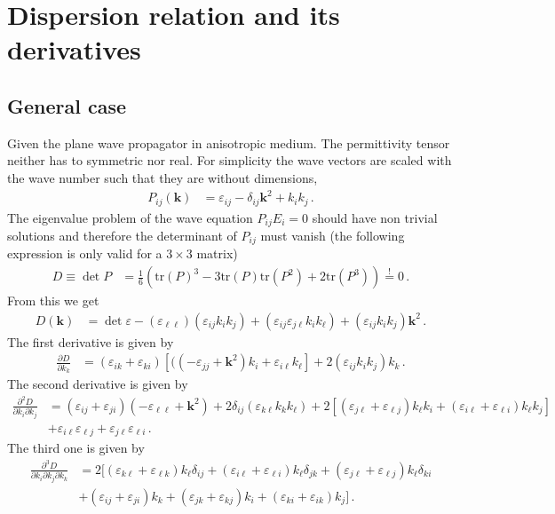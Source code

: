 \documentclass[12pt,a4paper,twoside,openright,BCOR10mm,headsepline,titlepage,abstracton,chapterprefix,final]{scrreprt}
\newcommand{\vct}[1]{\mathbf{#1}}
\newcommand{\eps}[1]{\varepsilon_{#1}}
\newcommand{\deteps}{\det \varepsilon}
\newcommand{\tr}[1]{\text{tr}\left(#1\right)}
\begin{document}
\section{Dispersion relation and its derivatives}

\subsection{General case}

Given the plane wave propagator in anisotropic medium. The permittivity tensor neither has to symmetric nor real.
For simplicity the wave vectors are scaled with the wave number such that they are without dimensions,
\begin{align}
 P_{ij}(\vct{k}) &= \eps{ij} - \delta_{ij} \vct{k}^2 + k_i k_j\,.
\end{align}
The eigenvalue problem of the wave equation $P_{ij} E_i = 0$ should have non trivial solutions and therefore the determinant of $P_{ij}$
must vanish (the following expression is only valid for a $3\times3$ matrix)
\begin{align}
 D \equiv \det P &= \frac{1}{6} (\tr{P}^3 - 3 \tr{P} \tr{P^2} + 2 \tr{P^3}) \stackrel{!}{=} 0\,.
\end{align}
From this we get
\begin{align}
 D(\vct{k}) &= \deteps - (\eps{\ell\ell}) (\eps{ij} k_i k_j) + (\eps{ij} \eps{j \ell} k_i k_\ell) + (\eps{ij} k_i k_j) \vct{k}^2\,. 
\end{align}
The first derivative is given by
\begin{align}
 \frac{\partial D}{\partial k_k} &= (\eps{ik} + \eps{ki}) [((-\eps{jj} + \vct{k}^2)k_i + \eps{i\ell} k_\ell] + 2(\eps{ij} k_i k_j) k_k\,. 
\end{align}
The second derivative is given by
\begin{align}
 \frac{\partial^2 D}{\partial k_i \partial k_j} &= (\eps{ij} + \eps{ji})(-\eps{\ell\ell} + \vct{k}^2) + 2 \delta_{ij} (\eps{k\ell} k_k k_\ell)
  + 2[(\eps{j \ell} + \eps{\ell j}) k_\ell k_i + (\eps{i \ell} + \eps{\ell i}) k_\ell k_j] \nonumber\\
  &+ \eps{i \ell} \eps{\ell j} + \eps{j \ell} \eps{\ell i}\,.
\end{align}
The third one is given by
\begin{align}
 \frac{\partial^3 D}{\partial k_i \partial k_j \partial k_k} &= 2 \biggl[
  (\eps{k\ell} + \eps{\ell k})k_\ell \delta_{ij}
  + (\eps{i\ell} + \eps{\ell i})k_\ell \delta_{jk}
  + (\eps{j\ell} + \eps{\ell j})k_\ell \delta_{ki} \nonumber\\&
  + (\eps{ij} + \eps{ji}) k_k
  + (\eps{jk} + \eps{kj}) k_i
  + (\eps{ki} + \eps{ik}) k_j
 \biggr]\,.
\end{align}
\end{document}
